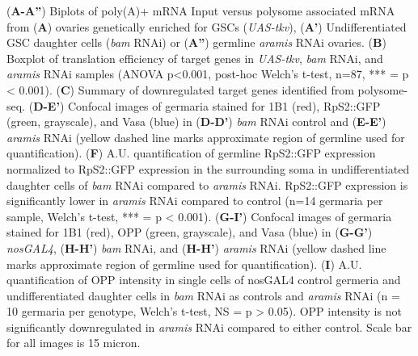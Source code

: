 \documentclass[12pt,oneside]{reedthesis}
\begin{document}
\textbf{\hfill\break
}

(\textbf{A-A''}) Biplots of poly(A)+ mRNA Input versus polysome
associated mRNA from (\textbf{A}) ovaries genetically enriched for GSCs
(\emph{UAS-tkv}), (\textbf{A'}) Undifferentiated GSC daughter cells (\emph{bam} RNAi)
or (\textbf{A''}) germline \emph{aramis} RNAi ovaries. (\textbf{B}) Boxplot of
translation efficiency of target genes in \emph{UAS-tkv}, \emph{bam} RNAi, and
\emph{aramis} RNAi samples (ANOVA p\textless0.001, post-hoc Welch's t-test, n=87,
*** = p \textless{} 0.001). (\textbf{C}) Summary of downregulated target genes
identified from polysome-seq. (\textbf{D-E'}) Confocal images of germaria
stained for 1B1 (red), RpS2::GFP (green, grayscale), and Vasa (blue) in
(\textbf{D-D'}) \emph{bam} RNAi control and (\textbf{E-E'}) \emph{aramis} RNAi (yellow
dashed line marks approximate region of germline used for
quantification). (\textbf{F}) A.U. quantification of germline RpS2::GFP
expression normalized to RpS2::GFP expression in the surrounding soma in
undifferentiated daughter cells of \emph{bam} RNAi compared to \emph{aramis} RNAi.
RpS2::GFP expression is significantly lower in \emph{aramis} RNAi compared to
control (n=14 germaria per sample, Welch's t-test, *** = p \textless{} 0.001).
(\textbf{G-I'}) Confocal images of germaria stained for 1B1 (red), OPP
(green, grayscale), and Vasa (blue) in (\textbf{G-G'}) \emph{nosGAL4}, (\textbf{H-H'})
\emph{bam} RNAi, and (\textbf{H-H'}) \emph{aramis} RNAi (yellow dashed line marks
approximate region of germline used for quantification). (\textbf{I}) A.U.
quantification of OPP intensity in single cells of nosGAL4 control
germeria and undifferentiated daughter cells in \emph{bam} RNAi as controls
and \emph{aramis} RNAi (n = 10 germaria per genotype, Welch's t-test, NS = p
\textgreater{} 0.05). OPP intensity is not significantly downregulated in \emph{aramis}
RNAi compared to either control. Scale bar for all images is 15 micron.

\textbf{\hfill\break
}
\end{document}

